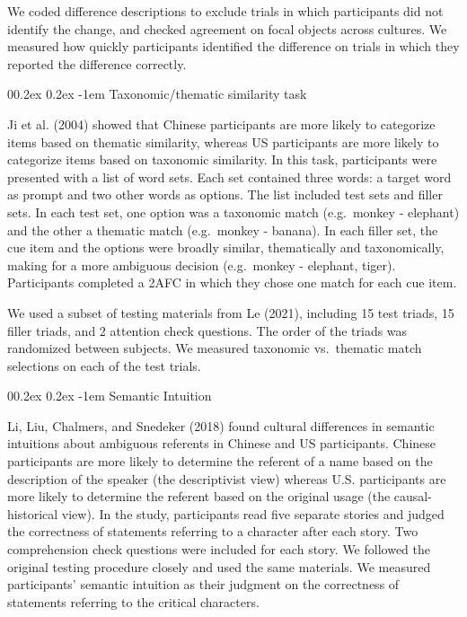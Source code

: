 \documentclass[
  man,floatsintext]{apa6}
\makeatletter
\let\oldparagraph\paragraph
\renewcommand{\paragraph}[1]{\oldparagraph{#1}\mbox{}}
\renewcommand{\paragraph}{\@startsection{paragraph}{4}{\parindent}%
  {0\baselineskip \@plus 0.2ex \@minus 0.2ex}%
  {-1em}%
  {\normalfont\normalsize\bfseries\itshape\typesectitle}}
\makeatother
\begin{document}
We coded difference descriptions to exclude trials in which participants did not identify the change, and checked agreement on focal objects across cultures. We measured how quickly participants identified the difference on trials in which they reported the difference correctly.

\hypertarget{taxonomicthematic-similarity-task}{%
\paragraph{Taxonomic/thematic similarity task}\label{taxonomicthematic-similarity-task}}

Ji et al. (2004) showed that Chinese participants are more likely to categorize items based on thematic similarity, whereas US participants are more likely to categorize items based on taxonomic similarity. In this task, participants were presented with a list of word sets. Each set contained three words: a target word as prompt and two other words as options. The list included test sets and filler sets. In each test set, one option was a taxonomic match (e.g.~monkey - elephant) and the other a thematic match (e.g.~monkey - banana). In each filler set, the cue item and the options were broadly similar, thematically and taxonomically, making for a more ambiguous decision (e.g.~monkey - elephant, tiger). Participants completed a 2AFC in which they chose one match for each cue item.

We used a subset of testing materials from Le (2021), including 15 test triads, 15 filler triads, and 2 attention check questions. The order of the triads was randomized between subjects. We measured taxonomic vs.~thematic match selections on each of the test trials.

\hypertarget{semantic-intuition}{%
\paragraph{Semantic Intuition}\label{semantic-intuition}}

Li, Liu, Chalmers, and Snedeker (2018) found cultural differences in semantic intuitions about ambiguous referents in Chinese and US participants. Chinese participants are more likely to determine the referent of a name based on the description of the speaker (the descriptivist view) whereas U.S. participants are more likely to determine the referent based on the original usage (the causal-historical view). In the study, participants read five separate stories and judged the correctness of statements referring to a character after each story. Two comprehension check questions were included for each story. We followed the original testing procedure closely and used the same materials. We measured participants' semantic intuition as their judgment on the correctness of statements referring to the critical characters.
\end{document}
